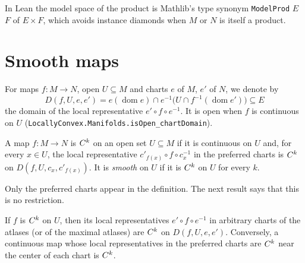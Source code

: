 In Lean the model space of the product is Mathlib's type synonym \texttt{ModelProd} $E$ $F$ of
$E \times F$, which avoids instance diamonds when $M$ or $N$ is itself a product.

\section{Smooth maps}

For maps $f \colon M \to N$, open $U \subseteq M$ and charts $e$ of $M$, $e'$ of $N$, we denote
by
\[
  D(f, U, e, e') = e(\operatorname{dom} e) \cap e^{-1}\bigl(U \cap f^{-1}(\operatorname{dom}
  e')\bigr) \subseteq E
\]
the domain of the local representative $e' \circ f \circ e^{-1}$. It is open when $f$ is
continuous on $U$ (\texttt{LocallyConvex.Manifolds.isOpen\_chartDomain}).

\begin{definition}
  \label{def:contmdiff}
  \leanok
  A map $f \colon M \to N$ is $C^{k}$ on an open set $U \subseteq M$ if it is continuous on $U$
  and, for every $x \in U$, the local representative $c'_{f(x)} \circ f \circ c_x^{-1}$ in the
  preferred charts is $C^{k}$ on $D(f, U, c_x, c'_{f(x)})$. It is \emph{smooth} on $U$ if it is
  $C^{k}$ on $U$ for every $k$.
\end{definition}

Only the preferred charts appear in the definition. The next result says that this is no
restriction.

\begin{theorem}
  \label{thm:man-contmdiff-chart}
  \leanok
  If $f$ is $C^{k}$ on $U$, then its local representatives $e' \circ f \circ e^{-1}$ in arbitrary
  charts of the atlases (or of the maximal atlases) are $C^{k}$ on $D(f, U, e, e')$.
  Conversely, a continuous map whose local representatives in the preferred charts are
  $C^{k}$ near the center of each chart is $C^{k}$.
\end{theorem}

